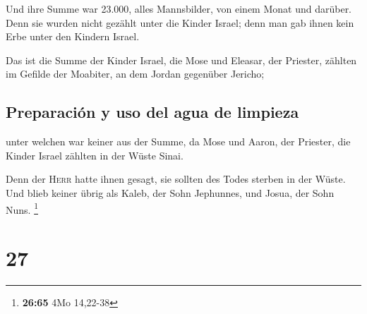  Und ihre Summe war 23.000, alles Mannsbilder, von einem
Monat und darüber. Denn sie wurden nicht gezählt unter die Kinder
Israel; denn man gab ihnen kein Erbe unter den Kindern Israel.

 Das ist die Summe der Kinder Israel, die Mose und
Eleasar, der Priester, zählten im Gefilde der Moabiter, an dem Jordan
gegenüber Jericho;

\hypertarget{preparaciuxf3n-y-uso-del-agua-de-limpieza}{%
\subsection{Preparación y uso del agua de
limpieza}\label{preparaciuxf3n-y-uso-del-agua-de-limpieza}}

 unter welchen war keiner aus der Summe, da Mose und
Aaron, der Priester, die Kinder Israel zählten in der Wüste Sinai.

 Denn der \textsc{Herr} hatte ihnen gesagt, sie sollten
des Todes sterben in der Wüste. Und blieb keiner übrig als Kaleb, der
Sohn Jephunnes, und Josua, der Sohn Nuns. \footnote{\textbf{26:65} 4Mo
  14,22-38}

\hypertarget{section-26}{%
\section{27}\label{section-26}}


